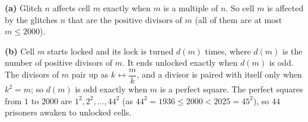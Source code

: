 \textbf{(a)} Glitch $n$ affects cell $m$ exactly when $m$ is a multiple of $n$. So cell $m$ is affected by the glitches $n$ that are the $\boxed{\text{positive divisors of }m}$ (all of them are at most $m\le2000$).

\textbf{(b)} Cell $m$ starts locked and its lock is turned $d(m)$ times, where $d(m)$ is the number of positive divisors of $m$. It ends unlocked exactly when $d(m)$ is odd. The divisors of $m$ pair up as $k\leftrightarrow\dfrac {m}{k}$, and a divisor is paired with itself only when $k^2=m$; so $d(m)$ is odd exactly when $m$ is a perfect square. The perfect squares from $1$ to $2000$ are $1^2,2^2,\dots,44^2$ (as $44^2=1936\le2000<2025=45^2$), so $\boxed{44}$ prisoners awaken to unlocked cells.
